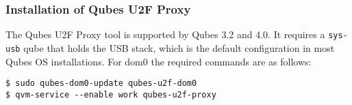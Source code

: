 \documentclass[runningheads,a4paper]{article}
\begin{document}
\subsubsection{Installation of Qubes U2F Proxy}
The Qubes U2F Proxy tool is supported by Qubes 3.2 and 4.0. It requires a \texttt{sys-usb} qube that holds the USB stack, which is the default configuration in most Qubes OS installations. For dom0 the required commands are as follows:
\begin{verbatim}
$ sudo qubes-dom0-update qubes-u2f-dom0
$ qvm-service --enable work qubes-u2f-proxy
\end{verbatim}






\end{document}
